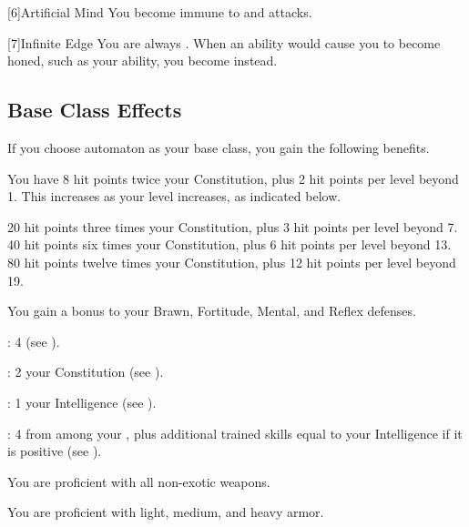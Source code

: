     [6]{Artificial Mind} You become immune to  and  attacks.

    [7]{Infinite Edge} You are always \honed.
    When an ability would cause you to become honed, such as your  ability, you become \empowered instead.

  \subsection{Base Class Effects}
    \highhpprogressiontable

    If you choose automaton as your base class, you gain the following benefits.

      You have 8 hit points \add twice your Constitution, plus 2 hit points per level beyond 1.
      This increases as your level increases, as indicated below.
      \begin{raggeditemize}
         20 hit points \add three times your Constitution, plus 3 hit points per level beyond 7.
         40 hit points \add six times your Constitution, plus 6 hit points per level beyond 13.
         80 hit points \add twelve times your Constitution, plus 12 hit points per level beyond 19.
      \end{raggeditemize}

      You gain a  bonus to your Brawn, Fortitude, Mental, and Reflex defenses.

      \begin{raggeditemize}
          \item {}: 4 (see ).
          \item {}: 2 \add your Constitution (see ).
          \item {}: 1 \add your Intelligence (see ).
          \item {}: 4 from among your , plus additional trained skills equal to your Intelligence if it is positive (see ).
      \end{raggeditemize}

      You are proficient with all non-exotic weapons.

      You are proficient with light, medium, and heavy armor.

